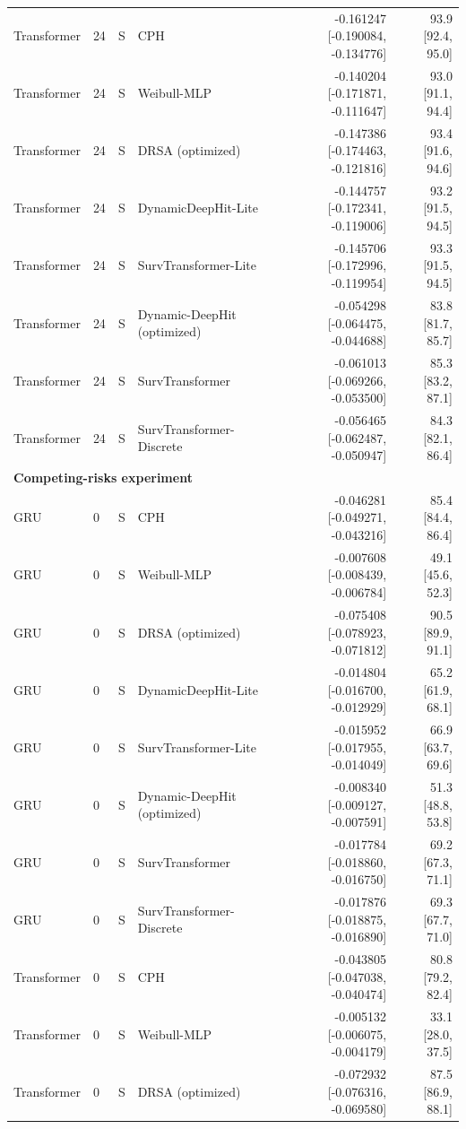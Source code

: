 \begin{longtable}{lll p{3.0cm} rr}
Transformer & 24 & S & CPH & -0.161247 [-0.190084, -0.134776] & 93.9 [92.4, 95.0]\\
Transformer & 24 & S & Weibull-MLP & -0.140204 [-0.171871, -0.111647] & 93.0 [91.1, 94.4]\\
Transformer & 24 & S & DRSA (optimized) & -0.147386 [-0.174463, -0.121816] & 93.4 [91.6, 94.6]\\
Transformer & 24 & S & DynamicDeepHit-Lite & -0.144757 [-0.172341, -0.119006] & 93.2 [91.5, 94.5]\\
Transformer & 24 & S & SurvTransformer-Lite & -0.145706 [-0.172996, -0.119954] & 93.3 [91.5, 94.5]\\
Transformer & 24 & S & Dynamic-DeepHit (optimized) & -0.054298 [-0.064475, -0.044688] & 83.8 [81.7, 85.7]\\
Transformer & 24 & S & SurvTransformer & -0.061013 [-0.069266, -0.053500] & 85.3 [83.2, 87.1]\\
Transformer & 24 & S & SurvTransformer-Discrete & -0.056465 [-0.062487, -0.050947] & 84.3 [82.1, 86.4]\\
\multicolumn{6}{l}{\textbf{Competing-risks experiment}}\\\midrule
GRU & 0 & S & CPH & -0.046281 [-0.049271, -0.043216] & 85.4 [84.4, 86.4]\\
GRU & 0 & S & Weibull-MLP & -0.007608 [-0.008439, -0.006784] & 49.1 [45.6, 52.3]\\
GRU & 0 & S & DRSA (optimized) & -0.075408 [-0.078923, -0.071812] & 90.5 [89.9, 91.1]\\
GRU & 0 & S & DynamicDeepHit-Lite & -0.014804 [-0.016700, -0.012929] & 65.2 [61.9, 68.1]\\
GRU & 0 & S & SurvTransformer-Lite & -0.015952 [-0.017955, -0.014049] & 66.9 [63.7, 69.6]\\
GRU & 0 & S & Dynamic-DeepHit (optimized) & -0.008340 [-0.009127, -0.007591] & 51.3 [48.8, 53.8]\\
GRU & 0 & S & SurvTransformer & -0.017784 [-0.018860, -0.016750] & 69.2 [67.3, 71.1]\\
GRU & 0 & S & SurvTransformer-Discrete & -0.017876 [-0.018875, -0.016890] & 69.3 [67.7, 71.0]\\
Transformer & 0 & S & CPH & -0.043805 [-0.047038, -0.040474] & 80.8 [79.2, 82.4]\\
Transformer & 0 & S & Weibull-MLP & -0.005132 [-0.006075, -0.004179] & 33.1 [28.0, 37.5]\\
Transformer & 0 & S & DRSA (optimized) & -0.072932 [-0.076316, -0.069580] & 87.5 [86.9, 88.1]\\

\end{longtable}
